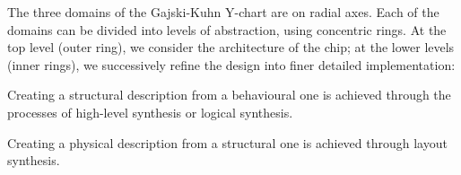 \documentclass{article}
\begin{document}
The three domains of the Gajski-Kuhn Y-chart are on radial axes.  Each of the domains can be divided into levels of abstraction, using concentric rings.  At the top level (outer ring), we consider the architecture of the chip; at the lower levels (inner rings), we successively refine the design into finer detailed implementation:

Creating a structural description from a behavioural one is achieved through the processes of high-level synthesis or logical synthesis.

Creating a physical description from a structural one is achieved through layout synthesis.
\end{document}
